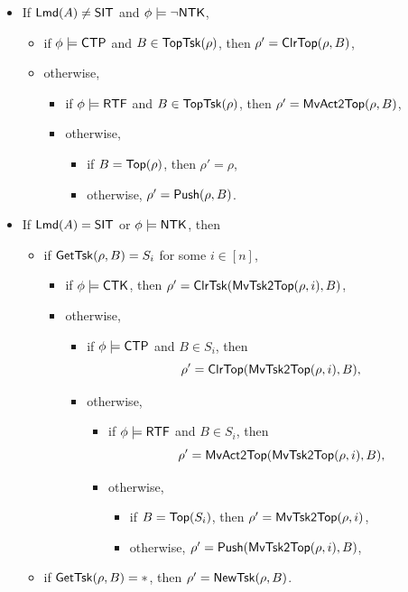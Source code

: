 \noindent {}
\begin{itemize}
	\item If ${\sf Lmd}(A) \neq {\sf SIT}$ and $\phi \models \neg {\sf NTK}$, 
	\begin{itemize}
        \item if $\phi \models{\sf CTP}$ and $B \in \mathsf{TopTsk}(\rho)$, then $\rho' =\mathsf{ClrTop}(\rho, B)$,
		\item otherwise,
		\begin{itemize}
			\item if $\phi \models {\sf RTF}$ and $B \in \mathsf{TopTsk}(\rho)$, then $\rho'=\mathsf{MvAct2Top}(\rho, B)$,
			\item otherwise,
			\begin{itemize}
				\item if $B = \mathsf{Top}(\rho)$, then $\rho' = \rho$,
				\item otherwise, $\rho' = \mathsf{Push}(\rho, B)$.
			\end{itemize}
		\end{itemize}
	\end{itemize}
	\item If ${\sf Lmd}(A) = {\sf SIT}$ or $\phi \models {\sf NTK}$, then
	\begin{itemize}
		\item if $\mathsf{GetTsk}(\rho, B) = S_i$ for some $i\in[n]$,
		\begin{itemize}
            \item if $\phi \models{\sf CTK}$, then $\rho' = \mathsf{ClrTsk}(\mathsf{MvTsk2Top}(\rho, i), B)$,
			\item otherwise, 
			\begin{itemize}
				\item if $\phi \models{\sf CTP}$ and $B \in S_i$, then 
				$$\rho' =\mathsf{ClrTop}(\mathsf{MvTsk2Top}(\rho, i), B),$$
				\item otherwise,
				\begin{itemize}
					\item if $\phi \models {\sf RTF}$ and $B \in S_i$, then 
					$$\rho'=\mathsf{MvAct2Top}(\mathsf{MvTsk2Top}(\rho, i), B),$$
					\item otherwise,
					\begin{itemize}
						\item if $B = \mathsf{Top}(S_i)$, then $\rho' = \mathsf{MvTsk2Top}(\rho, i)$,
						\item otherwise, $\rho'=\mathsf{Push}(\mathsf{MvTsk2Top}(\rho, i), B)$,
					\end{itemize}
				\end{itemize}
			\end{itemize}
		\end{itemize}
		\item if $\mathsf{GetTsk}(\rho, B) = *$, then $\rho' = \mathsf{NewTsk}(\rho, B)$.
	\end{itemize}
\end{itemize}

